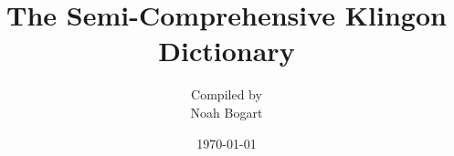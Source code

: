 \documentclass[twocolumn,10pt]{book}
\begin{document}
\setlength{\parskip}{3pt}
\title{The Semi-Comprehensive Klingon Dictionary}
\author{\small{Compiled by}\\\normalsize{Noah Bogart}}
\date{\today}
\maketitle

\tableofcontents










































\end{document}
